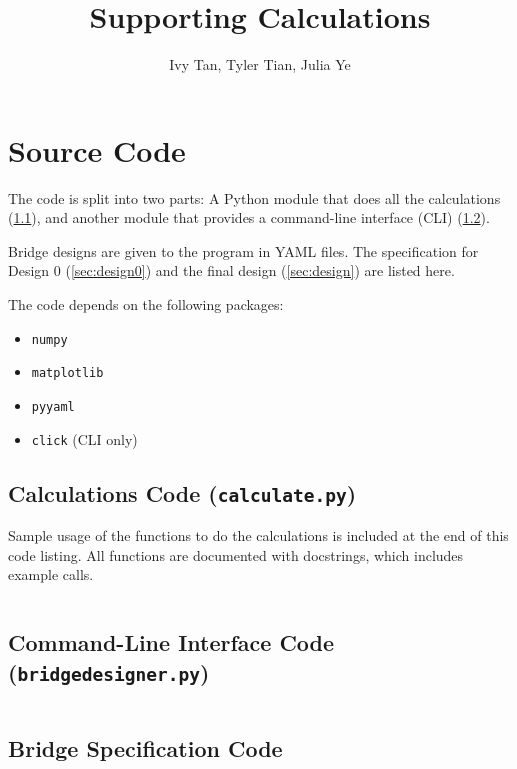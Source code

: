 \documentclass{article}
\title{Supporting Calculations}
\author{Ivy Tan, Tyler Tian, Julia Ye}
\begin{document}
\maketitle
\sloppy

\section{Source Code}

The code is split into two parts: A Python module that does all the calculations (\ref{sec:calc}), and another module
that provides a command-line interface (CLI) (\ref{sec:cli}).

Bridge designs are given to the program in YAML files. The specification for Design 0 (\ref{sec:design0}) and the final
design (\ref{sec:design}) are listed here.

The code depends on the following packages:
\begin{itemize}
    \setlength\itemsep{0em}
    \item \texttt{numpy}
    \item \texttt{matplotlib}
    \item \texttt{pyyaml}
    \item \texttt{click} (CLI only)
\end{itemize}

\subsection{Calculations Code (\texttt{calculate.py})}
\label{sec:calc}

Sample usage of the functions to do the calculations is included at the end of this code listing. All functions are
documented with docstrings, which includes example calls.

\inputminted[linenos, breaklines, fontsize=\small]{python}{../../calculate.py}
\pagebreak

\subsection{Command-Line Interface Code (\texttt{bridgedesigner.py})}
\label{sec:cli}

\inputminted[linenos, breaklines, fontsize=\small]{python}{../../bridgedesigner.py}
\pagebreak

\subsection{Bridge Specification Code}
\end{document}
